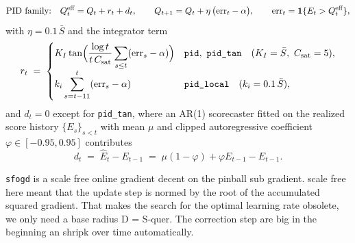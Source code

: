 \begin{equation}
  \text{PID family:}\quad
  Q^{\text{eff}}_t = Q_t + r_t + d_t,
  \qquad
  Q_{t+1} = Q_t + \eta\,\big(\mathrm{err}_t - \alpha\big),
  \qquad
  \mathrm{err}_t = \mathbf{1}\{E_t > Q^{\text{eff}}_t\},
  \label{eq:m-pid}
\end{equation}
with $\eta = 0.1\,\bar S$ and the integrator term
\begin{equation}
  r_t \;=\;
  \begin{cases}
    K_I \tan\!\Big(\dfrac{\log t}{t\, C_{\text{sat}}}
                   \displaystyle\sum_{s \le t}(\mathrm{err}_s - \alphamis)\Big)
      & \texttt{pid},\ \texttt{pid\_tan} \quad (K_I = \bar S,\ C_{\text{sat}} = 5),\\[10pt]
    k_i \displaystyle\sum_{s = t-11}^{t}(\mathrm{err}_s - \alphamis)
      & \texttt{pid\_local} \quad (k_i = 0.1\,\bar S),
  \end{cases}
  \label{eq:m-pid-integrator}
\end{equation}
and $d_t = 0$ except for \texttt{pid\_tan}, where an AR(1) scorecaster fitted
on the realized score history $\{E_s\}_{s<t}$ with mean $\mu$ and clipped
autoregressive coefficient $\varphi \in [-0.95, 0.95]$ contributes
\begin{equation}
  d_t \;=\; \hat E_{t} - E_{t-1}
        \;=\; \mu(1-\varphi) + \varphi E_{t-1} - E_{t-1}.
  \label{eq:m-pid-d}
\end{equation}


\texttt{sfogd} \parencite{bhatnagar2023sfogd} is a scale free online gradient decent on the pinball sub gradient. scale free here meant that the update step is normed by the root of the accumulated squared gradient. That makes the search for the optimal learning rate obsolete, we only need a base radius D = S-quer. The correction step are big in the beginning an shripk over time automatically.

